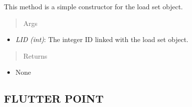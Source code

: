 \documentclass[letterpaper,10pt,english]{sphinxmanual}
\begin{document}
\begin{fulllineitems}
\begin{fulllineitems}
This method is a simple constructor for the load set object.
\begin{quote}\begin{description}
\item[{Args}] \leavevmode
\end{description}\end{quote}
\begin{itemize}
\item {} 
\emph{LID (int)}: The integer ID linked with the load set object.

\end{itemize}
\begin{quote}\begin{description}
\item[{Returns}] \leavevmode
\end{description}\end{quote}
\begin{itemize}
\item {} 
None

\end{itemize}

\end{fulllineitems}


\end{fulllineitems}



\subsection{FLUTTER POINT}
\label{FEM:flutter-point}
\end{document}

